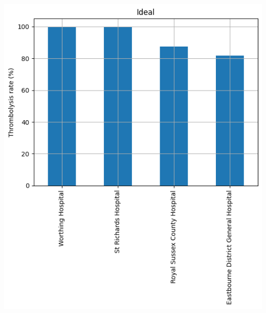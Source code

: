 \begin{frame}
\begin{columns}[T]
\begin{column}{0.5\textwidth}
      \includegraphics[width=1.0\textwidth]{./sussex/images/subgroup_ideal}
    \end{column}
  \end{columns}

\end{frame}


